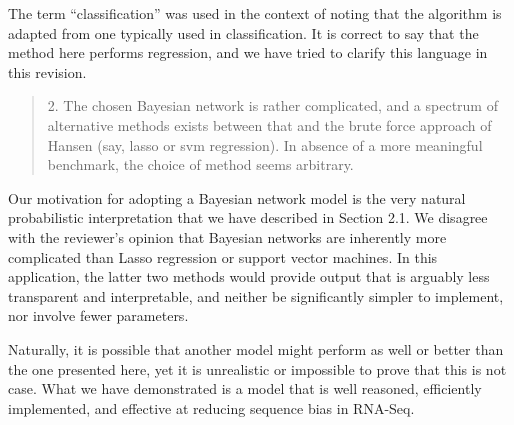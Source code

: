 \documentclass{article}
\begin{document}
The term ``classification'' was used in the context of noting that the algorithm
is adapted from one typically used in classification. It is correct to say that
the method here performs regression, and we have tried to clarify this language
in this revision.



\begin{quote}
2. The chosen Bayesian network is rather complicated, and a spectrum
of alternative methods exists between that and the brute force
approach of Hansen (say, lasso or svm regression). In absence of a
more meaningful benchmark, the choice of method seems arbitrary.
\end{quote}

Our motivation for adopting a Bayesian network model is the very natural
probabilistic interpretation that we have described in Section 2.1. We
disagree with the reviewer's opinion that Bayesian networks are inherently more
complicated than Lasso regression or support vector machines.  In this
application, the latter two methods would provide output that is arguably less
transparent and interpretable, and neither be significantly simpler to
implement, nor involve fewer parameters.

Naturally, it is possible that another model might perform as well or better
than the one presented here, yet it is unrealistic or impossible to prove that
this is not case. What we have demonstrated is a model that is well reasoned,
efficiently implemented, and effective at reducing sequence bias in RNA-Seq.
\end{document}
